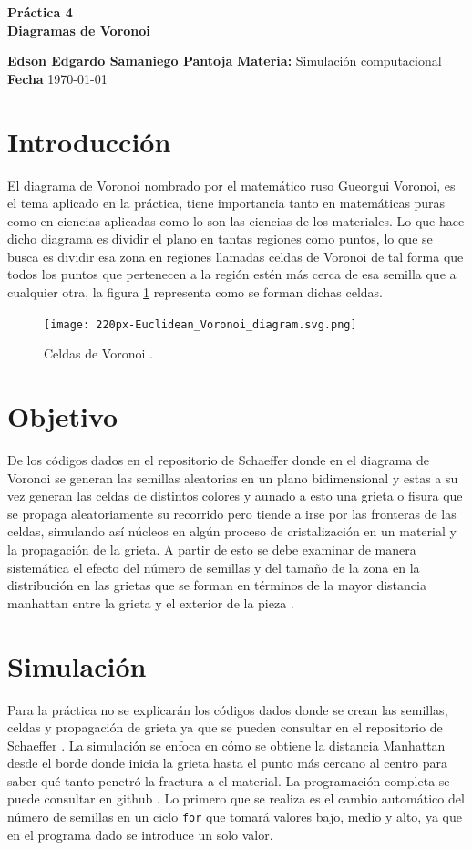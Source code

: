 \documentclass[a4paper, 11pt]{article}
\begin{document}
\begin{center}
\LARGE \bf Pr\'actica 4\\ Diagramas de Voronoi 
\end{center}

\vspace{1cm} 
\noindent\textbf {Edson Edgardo Samaniego Pantoja} \hfill \textbf{Materia:} Simulación computacional 
\hfill \\
\textbf{Fecha} \today  
\vspace{1cm} 

\section{Introducción}
El diagrama de Voronoi nombrado por el matemático ruso  Gueorgui Voronoi, es el tema aplicado en la práctica, tiene importancia tanto en matemáticas puras como en ciencias aplicadas como lo son las ciencias de los materiales. Lo que hace dicho diagrama es dividir el plano en tantas regiones como puntos, lo que se busca es dividir esa zona en regiones llamadas celdas de Voronoi de tal forma que todos los puntos que pertenecen a la región estén más cerca de esa semilla que a cualquier otra, la figura \ref{f5} representa como se forman dichas celdas.
\begin{figure}[H]
  \centering      
  \texttt{[image: 220px-Euclidean\_Voronoi\_diagram.svg.png]}
  \caption{Celdas de Voronoi \cite{imgVOR}.} 
  \label{f5}
\end{figure}
\bigskip

\section{Objetivo}
De los códigos dados en el repositorio de Schaeffer \cite{dra} donde en el diagrama de Voronoi se generan las semillas aleatorias en un plano bidimensional y estas a su vez generan las celdas de distintos colores y aunado a esto una grieta o fisura que se propaga aleatoriamente su recorrido pero tiende a irse por las fronteras de las celdas, simulando así núcleos en algún proceso de cristalización en un material y la propagación de la grieta. A partir de esto se debe examinar de manera sistemática el efecto del número de semillas y del tamaño de la zona en la distribución en las grietas que se forman en términos de la mayor distancia manhattan entre la grieta y el exterior de la pieza \cite{elisa}.

\section{Simulación}
Para la práctica no se explicarán los códigos dados donde se crean las semillas, celdas y propagación de grieta ya que se pueden consultar en el repositorio de Schaeffer \cite{dra}. La simulación se enfoca en cómo se obtiene la distancia Manhattan desde el borde donde inicia la grieta hasta el punto más cercano al centro para saber qué tanto penetró la fractura a el material.
La programación completa se puede consultar en github \cite{Edson}. Lo primero que se realiza es el cambio automático del número de semillas en un ciclo \texttt{for} que tomará valores bajo, medio y alto, ya que en el programa dado se introduce un solo valor.
\end{document}

